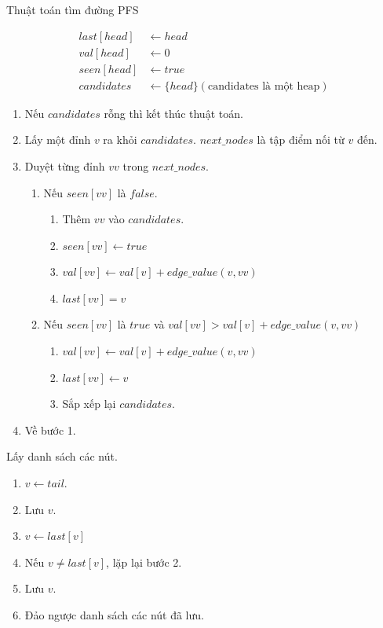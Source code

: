 \documentclass[a4paper,oneside,14pt]{extbook} %
\begin{document}
\begin{algo}
  \caption{Thuật toán tìm đường PFS}
  \label{algo:pfs}
  \begin{align*}
    last[head] &\leftarrow head\\
    val[head] &\leftarrow 0\\
    seen[head] &\leftarrow true\\
    candidates &\leftarrow \{ head \} (\text{candidates là một heap})
  \end{align*}

  \begin{enumerate}
  \item Nếu $candidates$ rỗng thì kết thúc thuật toán.
  \item Lấy một đỉnh $v$ ra khỏi $candidates$. $next\_nodes$ là tập điểm
    nối từ $v$ đến.
  \item Duyệt từng đỉnh $vv$ trong $next\_nodes$.
    \begin{enumerate}
    \item Nếu $seen[vv]$ là $false$.
      \begin{enumerate}
      \item Thêm $vv$ vào $candidates$.
      \item $seen[vv] \leftarrow true$
      \item $val[vv] \leftarrow val[v]+edge\_value(v,vv)$
      \item $last[vv] = v$
      \end{enumerate}
    \item Nếu $seen[vv]$ là $true$ và $val[vv] > val[v]+edge\_value(v,vv)$
      \begin{enumerate}
      \item $val[vv] \leftarrow val[v]+edge\_value(v,vv)$
      \item $last[vv] \leftarrow v$
      \item Sắp xếp lại $candidates$.
      \end{enumerate}
    \end{enumerate}
  \item Về bước 1.
  \end{enumerate}

Lấy danh sách các nút.
  \begin{enumerate}
  \item $v \leftarrow tail$.
  \item Lưu $v$.
  \item $v \leftarrow last[v]$
  \item Nếu $v \ne last[v]$, lặp lại bước 2.
  \item Lưu $v$.
  \item Đảo ngược danh sách các nút đã lưu.
  \end{enumerate}
\end{algo}
\end{document}
